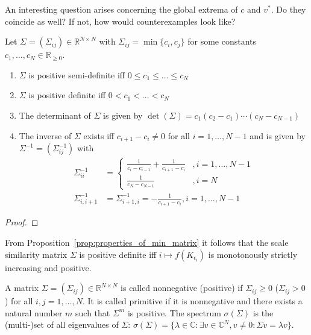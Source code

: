An interesting question arises concerning the global extrema of $c$ and $v^*$. Do they coincide as well? If not, how would counterexamples look like?

\begin{Prop}\label{prop:properties_of_min_matrix}
    Let $\Sigma=(\Sigma_{ij})\in\mathbb{R}^{N\times N}$ with $\Sigma_{ij}=\min\{c_i,c_j\}$ for some constants $c_1,\dots,c_N\in\mathbb{R}_{\ge0}$.
    \begin{enumerate}
        \item[1.] $\Sigma$ is positive semi-definite iff $0\le c_1\le\dots\le c_N$
        \item[2.] $\Sigma$ is positive definite iff $0<c_1<\dots<c_N$
        \item[3.] The determinant of $\Sigma$ is given by $\operatorname{det}(\Sigma)=c_1(c_2-c_1)\cdots(c_N-c_{N-1})$
        \item[4.] The inverse of $\Sigma$ exists iff $c_{i+1}-c_{i}\ne0$ for all $i=1,\dots,N-1$ and is given by $\Sigma^{-1}=(\Sigma^{-1}_{ij})$ with
        \begin{align*}
            \Sigma^{-1}_{ii}&=\begin{cases}
                \frac{1}{c_i-c_{i-1}}+\frac{1}{c_{i+1}-c_i} & ,i=1,\dots,N-1\\
                \frac{1}{c_{N}-c_{N-1}} & ,i=N
            \end{cases}\\
            \Sigma^{-1}_{i,i+1}&=\Sigma^{-1}_{i+1,i}=-\frac{1}{c_{i+1}-c_i},i=1,\dots,N-1
        \end{align*}
    \end{enumerate}
\end{Prop}
\begin{proof}
\end{proof}


\begin{Rem}
    From Proposition~\ref{prop:properties_of_min_matrix} it follows that the scale similarity matrix $\Sigma$ is positive definite iff $i\mapsto f(K_{\epsilon_i})$ is monotonously strictly increasing and positive.
\end{Rem}

A matrix $\Sigma=(\Sigma_{ij})\in\mathbb{R}^{N\times N}$ is called nonnegative (positive) if $\Sigma_{ij}\ge0$ ($\Sigma_{ij}>0$) for all $i,j=1,\dots,N$. It is called primitive if it is nonnegative and there exists a natural number $m$ such that $\Sigma^{m}$ is positive. The spectrum $\sigma(\Sigma)$ is the (multi-)set of all eigenvalues of $\Sigma$: $\sigma(\Sigma)=\{\lambda\in\mathbb{C}:\exists v\in\mathbb{C}^N,v\ne0:\Sigma v=\lambda v\}$.

